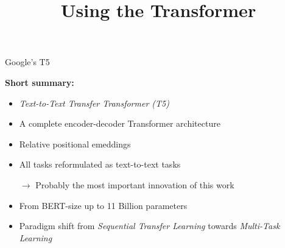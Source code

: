


\usepackage{movie15}

\newcommand{\titlefigure}{figure/sesamestreet.jpeg}
\newcommand{\learninggoals}{
\item Understand the improvements over BERT
\item Dynamic Masking}

\title{Using the Transformer}
\date{}




\begin{frame}{Google's T5 \href{https://arxiv.org/pdf/1910.10683.pdf}{}}

\vfill

	\textbf{Short summary:}

	\begin{itemize}
		\item \textit{Text-to-Text Transfer Transformer (T5)}
		\item A complete encoder-decoder Transformer architecture
		\item Relative positional emeddings
		\item All tasks reformulated as text-to-text tasks
		\item[$\to$] Probably the most important innovation of this work
		\item From BERT-size up to 11 Billion parameters
		\item Paradigm shift from \textit{Sequential Transfer Learning} towards \textit{Multi-Task Learning}
	\end{itemize}
	
	\vspace{.5cm}

	\begin{center}
		\href{https://1.bp.blogspot.com/-o4oiOExxq1s/Xk26XPC3haI/AAAAAAAAFU8/NBlvOWB84L0PTYy9TzZBaLf6fwPGJTR0QCLcBGAsYHQ/s1600/image3.gif}{\textbf{}}
	\end{center}
	
\vfill

\end{frame}

